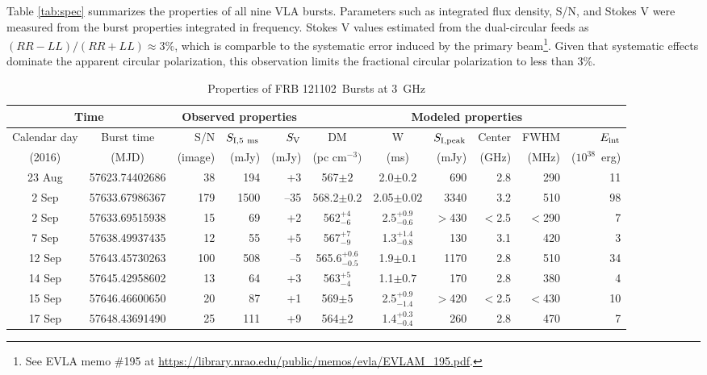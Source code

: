 \documentclass[twocolumn]{aastex61}
\newcommand{\frb}{FRB 121102}
\begin{document}
Table \ref{tab:spec} summarizes the properties of all nine VLA bursts. Parameters such as integrated flux density, S/N, and Stokes V were measured from the burst properties integrated in frequency. Stokes V values estimated from the dual-circular feeds as $(RR-LL)/(RR+LL)\approx3\%$, which is comparble to the systematic error induced by the primary beam\footnote{See EVLA memo \#195 at \url{https://library.nrao.edu/public/memos/evla/EVLAM_195.pdf}.}. Given that systematic effects dominate the apparent circular polarization, this observation limits the fractional circular polarization to less than 3\%.

\begin{table}
\caption{Properties of \frb\ Bursts at 3~GHz}
\centering
\begin{tabular}{cc|rrr|ccrrrr}
\multicolumn{2}{c|}{Time} & \multicolumn{3}{c|}{Observed properties} & \multicolumn{6}{c}{Modeled properties} \\ \hline
Calendar day & Burst time   & S/N & $S_{\rm{I, 5~ms}}$	& $S_{\rm{V}}$ 	& DM 			& W 			& $S_{\rm{I,peak}}$ & Center & FWHM & $E_{\rm{int}}$ \\
(2016)       &  (MJD)     &   (image)    & (mJy) 			& (mJy) 		    & (pc cm$^{-3})$ 	& (ms) 			& (mJy) 			& (GHz)  & (MHz) & ($10^{38}$\ erg)\\ \hline
23 Aug & 57623.74402686      & 38 		& 194			& +3				& 567$\pm2$ 		& 2.0$\pm0.2$	 		& 690 		& 2.8 		& 290 & 11 			\\
2 Sep & 57633.67986367      & 179 		& 1500			& --35 				& 568.2$\pm0.2$ 	& 2.05$\pm0.02$			& 3340 		& 3.2 		& 510 & 98				\\
2 Sep\tablenotemark{c} & 57633.69515938 & 15 & 69		& +2				& 562$^{+4}_{-6}$ 	& 2.5$^{+0.9}_{-0.6}$	& $>$430 	& $<$2.5	& $<$290 & 7  			\\
7 Sep & 57638.49937435      & 12 		& 55			& +5 				& 567$^{+7}_{-9}$ 	& 1.3$^{+1.4}_{-0.8}$	& 130 		& 3.1 		& 420 & 3  			\\
12 Sep\tablenotemark{a} & 57643.45730263  & 100 		& 508 & --5 		& 565.6$^{+0.6}_{-0.5}$ & 1.9$\pm0.1$		& 1170 		& 2.8 		& 510 & 34 			\\
14 Sep\tablenotemark{a} & 57645.42958602   & 13 		& 64 & +3			& 563$^{+5}_{-4}$ 	& 1.1$\pm0.7$		 	& 170 		& 2.8 		& 380 & 4  			\\
15 Sep\tablenotemark{c} & 57646.46600650 & 20 & 87		& +1				& 569$\pm5$ 		& 2.5$^{+0.9}_{-1.4}$	& $>$420 	& $<$2.5 	& $<$430 & 10 			\\	
17 Sep\tablenotemark{a,b} & 57648.43691490 & 25 & 111	& +9				& 564$\pm2$ 		& 1.4$^{+0.3}_{-0.4}$	& 260 		& 2.8 		& 470 & 7  			\\

\end{tabular}
\end{table}
\end{document}
